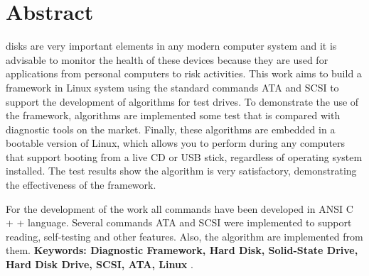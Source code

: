 \chapter*{Abstract}
\label{CHP:ABSTRACT}%
\thispagestyle{empty}


 disks are very important elements in any modern computer system and it is advisable to monitor the health of these devices because they are used for applications from personal computers to risk activities. This work aims to build a framework in Linux system using the standard commands \ac{ATA} and \ac{SCSI} to support the development of algorithms for test drives. To demonstrate the use of the framework, algorithms are implemented some test that is compared with diagnostic tools on the market. Finally, these algorithms are embedded in a bootable version of Linux, which allows you to perform during any computers that support booting from a live CD or USB stick, regardless of operating system installed. The test results show the algorithm is very satisfactory, demonstrating the effectiveness of the framework.

For the development of the work all commands have been developed in ANSI C + + language. Several commands \ac{ATA} and \ac{SCSI} were implemented to support reading, self-testing and other features. Also, the algorithm are implemented from them.
\noindent \textbf{Keywords: Diagnostic Framework, Hard Disk, Solid-State Drive, Hard Disk Drive, SCSI, ATA, Linux} .

